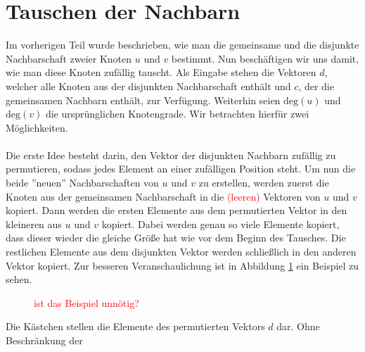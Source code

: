 \section{Tauschen der Nachbarn}
Im vorherigen Teil wurde beschrieben, wie man die gemeinsame und die disjunkte Nachbarschaft zweier Knoten
$u$ und $v$ bestimmt. Nun beschäftigen wir uns damit, wie man diese Knoten zufällig tauscht. Als Eingabe 
stehen die Vektoren $d$, welcher alle Knoten aus der disjunkten Nachbarschaft enthält
und $c$, der die gemeinsamen Nachbarn enthält, zur Verfügung. Weiterhin seien $\text{deg}(u)$ und
 $\text{deg}(v)$ die ursprünglichen Knotengrade. 
Wir betrachten hierfür zwei Möglichkeiten.
\\
\\
Die erste Idee besteht darin,  
den Vektor der disjunkten Nachbarn zufällig zu permutieren, sodass jedes Element an 
einer zufälligen Position steht. Um nun die beide ''neuen'' Nachbarschaften von $u$ und $v$ zu erstellen,
werden zuerst die Knoten aus der gemeinsamen Nachbarschaft in die \textcolor{red}{(leeren)} Vektoren von $u$ und $v$ kopiert.
Dann werden die ersten Elemente aus dem permutierten Vektor in den kleineren aus $u$ und $v$ kopiert.
Dabei werden genau so viele Elemente kopiert, dass dieser wieder die gleiche Größe hat wie vor dem Beginn
des Tausches. Die restlichen Elemente aus dem disjunkten Vektor werden schließlich in den anderen Vektor kopiert.
Zur besseren Veranschaulichung ist in Abbildung \ref{fig:trade_shuffle} ein Beispiel zu sehen.
\begin{figure}[h]
\centering
  \caption{\textcolor{red}{ist das Beispiel unnötig?}}
  \label{fig:trade_shuffle}
\end{figure}
Die Kästchen stellen die Elemente des permutierten Vektors $d$ dar. Ohne Beschränkung der
